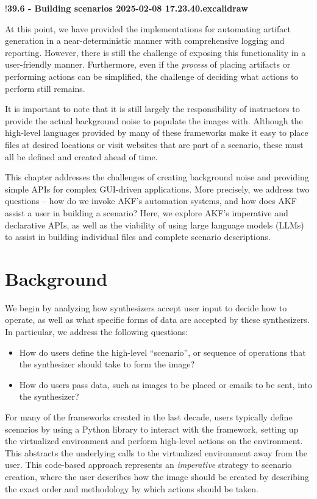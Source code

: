 \documentclass[letterpaper,12pt]{report}
\def\tightlist{}
\begin{document}
!\textbf{39.6 - Building scenarios 2025-02-08 17.23.40.excalidraw}

At this point, we have provided the implementations for automating
artifact generation in a near-deterministic manner with comprehensive
logging and reporting. However, there is still the challenge of exposing
this functionality in a user-friendly manner. Furthermore, even if the
\emph{process} of placing artifacts or performing actions can be
simplified, the challenge of deciding what actions to perform still
remains.

It is important to note that it is still largely the responsibility of
instructors to provide the actual background noise to populate the
images with. Although the high-level languages provided by many of these
frameworks make it easy to place files at desired locations or visit
websites that are part of a scenario, these must all be defined and
created ahead of time.

This chapter addresses the challenges of creating background noise and
providing simple APIs for complex GUI-driven applications. More
precisely, we address two questions -- how do we invoke AKF's automation
systems, and how does AKF assist a user in building a scenario? Here, we
explore AKF's imperative and declarative APIs, as well as the viability
of using large language models (LLMs) to assist in building individual
files and complete scenario descriptions.

\section{Background}\label{background}

We begin by analyzing how synthesizers accept user input to decide how
to operate, as well as what specific forms of data are accepted by these
synthesizers. In particular, we address the following questions:

\begin{itemize}
\tightlist
\item
  How do users define the high-level ``scenario'', or sequence of
  operations that the synthesizer should take to form the image?
\item
  How do users pass data, such as images to be placed or emails to be
  sent, into the synthesizer?
\end{itemize}

For many of the frameworks created in the last decade, users typically
define scenarios by using a Python library to interact with the
framework, setting up the virtualized environment and perform high-level
actions on the environment. This abstracts the underlying calls to the
virtualized environment away from the user. This code-based approach
represents an \emph{imperative} strategy to scenario creation, where the
user describes how the image should be created by describing the exact
order and methodology by which actions should be taken.
\end{document}
